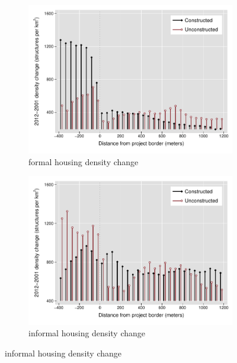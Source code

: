 \documentclass[12pt]{article}
\begin{document}
\begin{figure}[t!]
        \centering
        \caption[ Changes in Housing Densities in Constructed and Unconstructed Projects Areas]
        {\small Housing Densities in Constructed and Unconstructed projects } 
        \begin{subfigure}[b]{0.495\textwidth}   
            \centering 
            \includegraphics[width=\textwidth,trim={0.3cm .3cm 0.1cm 0cm}, clip=true]{figures/bblu_for_rawchanges_3}
            \caption[]%
            {{\small formal housing density change}}    
            \label{fig:forchange}
        \end{subfigure}
        \hfill
        \begin{subfigure}[b]{0.495\textwidth}   
            \centering 
            \includegraphics[width=\textwidth,trim={0.3cm .3cm 0.1cm 0cm}, clip=true]{figures/bblu_inf_rawchanges_3}
            \caption[]%
            {{\small informal housing density change}}    
            \label{fig:infchange}
        \end{subfigure}
        \label{fig:rawbblumeanschange}
        \vspace{-6mm}
    \end{figure} 
\end{document}
